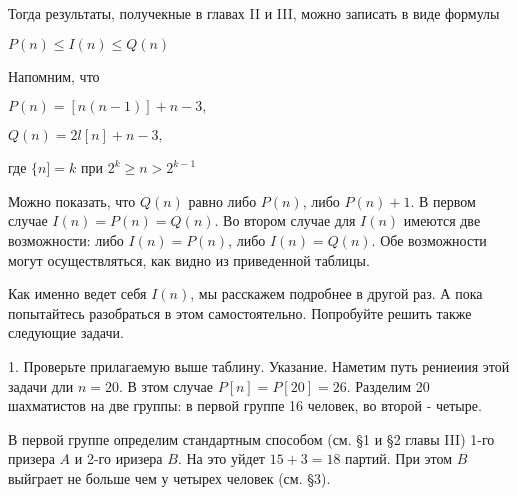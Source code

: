 \documentclass[9pt, a4paper]{article}
\begin{document}
\begin{footnotesize}
\setlength{\parindent}{8pt} 
\begin{multicols}{3}

Тогда результаты, получекные в главах II и III, можно записать в виде формулы

$
P(n) \leq I(n) \leq Q(n)
$

Напомним, что

$
P(n)=[n(n-1)]+n-3,
$

$
Q(n)=2l[n]+n-3,
$

где $\{n]=k$ при $2^k \geq n>2^{k-1}$

Можно показать, что $Q(n)$ равно либо $P(n)$, либо $P(n)+1$. В первом случае $I(n)=P(n)=Q(n)$. Во втором случае для $I(n)$ имеются две возможности: либо $I(n)=P(n)$, либо $I(n)=Q(n)$. Обе возможности могут осуществляться, как видно из приведенной таблицы.
\begin{wraptable}[4]{i}{2\linewidth}
\end{wraptable}
\break
\break
\break
\break

Как именно ведет себя $I(n)$, мы расскажем подробнее в другой раз. А пока попытайтесь разобраться в этом самостоятельно. Попробуйте решить также следующие задачи.

1. Проверьте прилагаемую выше таблину.
Указание. Наметим путь рениеиия этой задачи дли $n=20$. В зтом случае $P[n]=P[20]=26$.
Разделим 20 шахматистов на две группы: в первой группе 16 человек, во второй - четыре.

\columnbreak

В первой группе определим стандартным способом (см. §1 и §2 главы III) 1-го призера $A$ и 2-го иризера $B$. На это уйдет $15+3=18$ партий. При этом $B$ выйграет не больше чем у четырех человек (см. §3).


\end{multicols}
\end{footnotesize}
\end{document}
